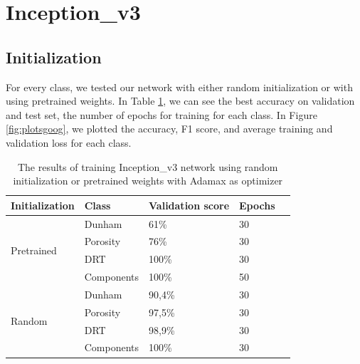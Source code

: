 

\section{Inception\_v3}\label{sec:gogl}
\subsection{Initialization}
For every class, we tested our network with either random initialization or with using pretrained weights. In Table \ref{tab:googinit}, we can see the best accuracy on validation and test set, the number of epochs for training for each class.  
In Figure \ref{fig:plotsgoog}, we plotted the accuracy, F1 score, and average training and validation loss for each class. 

\begin{table}
\caption{\label{tab:googinit} The results of training Inception\_v3 network using random initialization or pretrained weights with Adamax as optimizer}
\centering
\begin{tabular}[b]{| l | l | l | l | l |}
\hline
    Initialization & Class & Validation score  & Epochs\\ \hline
    \multirow{4}{*}{Pretrained} & Dunham &  61\%  & 30 \\ %
    & Porosity & 76\% &  30 \\
    &DRT & 100\% &  30 \\
    &Components & 100\% &  50 \\ \hline
     \multirow{4}{*}{Random} & Dunham &  90,4\% & 30 \\
    & Porosity & 97,5\% &  30 \\
    &DRT & 98,9\% &  30 \\
    &Components & 100\% & 30 \\ \hline
\end{tabular} 
\end{table}

